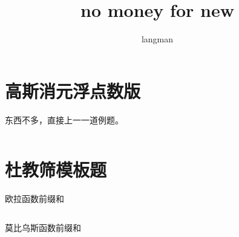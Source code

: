 \documentclass[a4paper,13.6pt]{article}
\author{langman}
\title{no money for new}
\begin{document}
\begin{CJK}{UTF8}{gbsn}


\section{高斯消元浮点数版}
东西不多，直接上一一道例题。
\inputminted{c++}{../../scoure/other/a.cpp}
\section{杜教筛模板题}
欧拉函数前缀和
\inputminted{c++}{../../scoure/other/b.cpp}
莫比乌斯函数前缀和
\inputminted{c++}{../../scoure/other/c.cpp}
\end{CJK}
\end{document}
